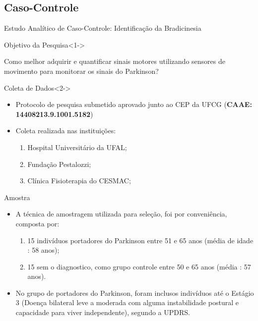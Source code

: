 \documentclass{beamer}
\begin{document}
\subsection{Caso-Controle}
\begin{frame}{Estudo Analítico de Caso-Controle: Identificação da Bradicinesia} 
    \begin{block}{Objetivo da Pesquisa}<1->

    
    Como melhor adquirir e quantificar sinais motores utilizando sensores de movimento para monitorar os sinais do Parkinson?

    \end{block}
		\begin{block}{Coleta de Dados}<2->
			\begin{itemize}
				\item Protocolo de pesquisa submetido aprovado junto ao CEP da UFCG (\textbf{CAAE: 14408213.9.1001.5182})
				\item Coleta realizada nas instituições:
					\begin{enumerate}
						\item Hospital Universitário da UFAL;
						\item Fundação Pestalozzi;
						\item Clínica Fisioterapia do CESMAC;
				\end{enumerate}				
			\end{itemize}
    \end{block}
\end{frame}

\begin{frame}{Amostra} 
    \begin{block}{}
			\begin{itemize}[<+->]
				\item A técnica de amostragem utilizada para seleção, foi por conveniência, composta por:
				\begin{enumerate}
					\item 15 indivíduos portadores do Parkinson entre 51 e 65 anos (média de idade : 58 anos);
					\item 15 sem o diagnostico, como grupo controle entre 50 e 65 anos (média : 57 anos).
				\end{enumerate}
					\item No grupo de portadores do Parkinson, foram inclusos indivíduos até o Estágio 3 (Doença bilateral leve a moderada com alguma instabilidade postural e capacidade para viver independente), segundo a UPDRS.
				\end{itemize}
    \end{block}
\end{frame}
 
\end{document}
